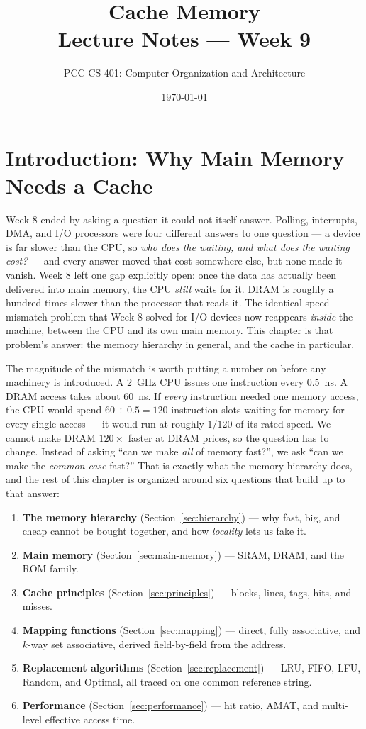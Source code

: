 \documentclass[11pt]{article}
\title{Cache Memory\\\large Lecture Notes --- Week 9}
\author{PCC CS-401: Computer Organization and Architecture}
\date{\today}
\begin{document}
\maketitle

\section{Introduction: Why Main Memory Needs a Cache}
\label{sec:intro}

Week 8 ended by asking a question it could not itself answer. Polling, interrupts, DMA, and I/O processors were four different answers to one question --- a device is far slower than the CPU, so \emph{who does the waiting, and what does the waiting cost?} --- and every answer moved that cost somewhere else, but none made it vanish. Week 8 left one gap explicitly open: once the data has actually been delivered into main memory, the CPU \emph{still} waits for it. DRAM is roughly a hundred times slower than the processor that reads it. The identical speed-mismatch problem that Week 8 solved for I/O devices now reappears \emph{inside} the machine, between the CPU and its own main memory. This chapter is that problem's answer: the memory hierarchy in general, and the cache in particular.

The magnitude of the mismatch is worth putting a number on before any machinery is introduced. A 2~GHz CPU issues one instruction every $0.5$~ns. A DRAM access takes about $60$~ns. If \emph{every} instruction needed one memory access, the CPU would spend $60 \div 0.5 = 120$ instruction slots waiting for memory for every single access --- it would run at roughly $1/120$ of its rated speed. We cannot make DRAM $120\times$ faster at DRAM prices, so the question has to change. Instead of asking ``can we make \emph{all} of memory fast?'', we ask ``can we make the \emph{common case} fast?'' That is exactly what the memory hierarchy does, and the rest of this chapter is organized around six questions that build up to that answer:

\begin{enumerate}
  \item \textbf{The memory hierarchy} (Section~\ref{sec:hierarchy}) --- why fast, big, and cheap cannot be bought together, and how \emph{locality} lets us fake it.
  \item \textbf{Main memory} (Section~\ref{sec:main-memory}) --- SRAM, DRAM, and the ROM family.
  \item \textbf{Cache principles} (Section~\ref{sec:principles}) --- blocks, lines, tags, hits, and misses.
  \item \textbf{Mapping functions} (Section~\ref{sec:mapping}) --- direct, fully associative, and $k$-way set associative, derived field-by-field from the address.
  \item \textbf{Replacement algorithms} (Section~\ref{sec:replacement}) --- LRU, FIFO, LFU, Random, and Optimal, all traced on one common reference string.
  \item \textbf{Performance} (Section~\ref{sec:performance}) --- hit ratio, AMAT, and multi-level effective access time.
\end{enumerate}
\end{document}
